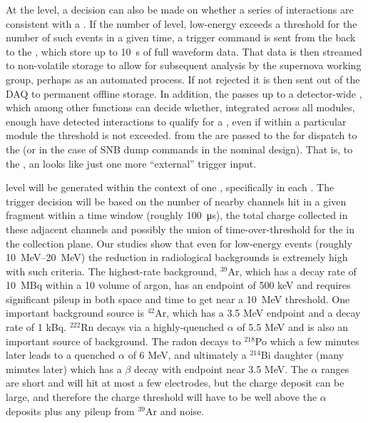 At the  level, a decision can also be made on whether
a series of interactions are consistent with a . 
If the number of  level, low-energy
 exceeds a threshold for the number of such
events in a given time, a trigger command is sent from the 
back to the , which store up to \SI{10}{\s} of full
waveform data. 
That data is then streamed to non-volatile storage to allow for
subsequent analysis by the supernova working group, perhaps as an
automated process. 
If not rejected it is then sent out of the DAQ to permanent offline
storage.
In addition, the  passes  up to a
detector-wide , which among other functions can decide
whether, integrated across all modules, enough  have
detected interactions to qualify for a , even if within a
particular module the threshold is not exceeded. 
 from the  are passed to the
 for dispatch to the  (or  in the
case of SNB dump commands in the nominal design). 
That is, to the , an  looks like just
one more ``external'' trigger input.

 level  will be generated within
the context of one , specifically in each . 
The trigger decision will be based on the number of nearby channels
hit in a given fragment within a time window (roughly \SI{100}{\us}),
the total charge collected in these adjacent channels and possibly the
union of time-over-threshold for the  in the
collection plane.
Our studies show that even for low-energy events (roughly
\SIrange{10}{20}{\MeV}) the reduction in radiological backgrounds is
extremely high with such criteria.
The highest-rate background, $^{39}$Ar, which has a decay rate of
10~MBq within a \SI{10}{\kton} volume of argon, has an endpoint of 500
keV and requires significant pileup in both space and time to get near
a \SI{10}{\MeV} threshold.
One important background source is $^{42}$Ar, which has a 3.5 MeV
endpoint and a decay rate of 1 kBq. 
$^{222}$Rn decays via a highly-quenched $\alpha$ of 5.5 MeV and is
also an important source of background.
The radon decays to $^{218}$Po which a few minutes later leads to a
quenched $\alpha$ of 6 MeV, and ultimately a $^{214}$Bi daughter (many
minutes later) which has a $\beta$ decay with endpoint near 3.5 MeV. 
The $\alpha$ ranges are short and will hit at most a few electrodes,
but the charge deposit can be large, and therefore the charge
threshold will have to be well above the $\alpha$ deposits plus any
pileup from $^{39}$Ar and noise.

